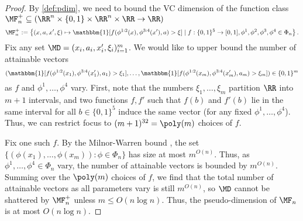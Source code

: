 \begin{proof}
By \cref{def:pdim}, we need to bound the VC dimension of the function class $\MF^+_n \subseteq (\RR^n\times\{0,1\}\times\RR^n\times\RR \to \RR)$
\[\MF^+_n := \left\{(x,a,x',\xi) \mapsto \mathbbm{1}[f(\phi^{1:2}(x),\phi^{3:4}(x'),a)>\xi] \mid{} f: \{0,1\}^5 \to [0,1], \phi^1,\phi^2,\phi^3,\phi^4 \in \Phi_n\right\}.\]
Fix any set $\MD = (x_i,a_i,x'_i,\xi_i)_{i=1}^m$. We would like to upper bound the number of attainable vectors
\[(\mathbbm{1}[f(\phi^{1:2}(x_1),\phi^{3:4}(x'_1),a_1)>\xi_1],\dots,\mathbbm{1}[f(\phi^{1:2}(x_m),\phi^{3:4}(x'_m),a_m)>\xi_m]) \in \{0,1\}^m\]
as $f$ and $\phi^1,\dots,\phi^4$ vary. First, note that the numbers $\xi_1,\dots,\xi_m$ partition $\RR$ into $m+1$ intervals, and two functions $f,f'$ such that $f(b)$ and $f'(b)$ lie in the same interval for all $b \in \{0,1\}^5$ induce the same vector (for any fixed $\phi^1,\dots,\phi^4$). Thus, we can restrict focus to $(m+1)^{32} = \poly(m)$ choices of $f$.

Fix one such $f$. By the Milnor-Warren bound \cite{milnor1964betti}, the set $\{(\phi(x_1),\dots,\phi(x_m)): \phi \in \Phi_n\}$ has size at most $m^{O(n)}$. Thus, as $\phi^1,\dots,\phi^4 \in \Phi_n$ vary, the number of attainable vectors is bounded by $m^{O(n)}$. Summing over the $\poly(m)$ choices of $f$, we find that the total number of attainable vectors as all parameters vary is still $m^{O(n)}$, so $\MD$ cannot be shattered by $\MF_n^+$ unless $m \leq O(n\log n)$. Thus, the pseudo-dimension of $\MF_n$ is at most $O(n\log n)$.
\end{proof}

